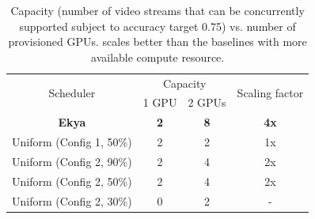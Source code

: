\begin{table}
\footnotesize
\begin{tabular}{cccc}
\hline
\multirow{2}{*}{Scheduler} & \multicolumn{2}{c}{Capacity} & \multirow{2}{*}{Scaling factor} \\ \cline{2-3}
& 1 GPU & 2 GPUs &  \\ \hline
\textbf{Ekya} & \textbf{2} & \textbf{8} & \textbf{4x} \\ \hline
Uniform (Config 1, 50\%) & 2 & 2 & 1x \\ \hline
Uniform (Config 2, 90\%) & 2 & 4 & 2x \\ \hline
Uniform (Config 2, 50\%) & 2 & 4 & 2x \\ \hline
Uniform (Config 2, 30\%) & 0 & 2 & - \\ \hline
\end{tabular}
\caption{ Capacity (number of video streams that can be concurrently supported subject to accuracy target 0.75) vs. number of provisioned GPUs.
\name scales better than the \fair baselines with more available compute resource.
}
\label{tab:scalability-gpu-vs-cam-thresholded}
\end{table}





